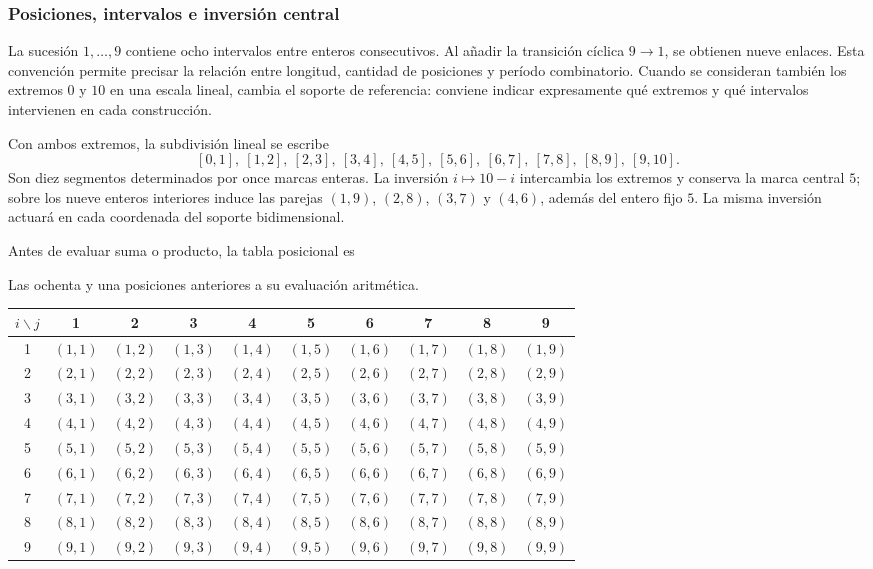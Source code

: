 \subsubsection{Posiciones, intervalos e inversión central}

La sucesión $1,\ldots,9$ contiene ocho intervalos entre enteros consecutivos. Al añadir la transición cíclica $9\to1$, se obtienen nueve enlaces. Esta convención permite precisar la relación entre longitud, cantidad de posiciones y período combinatorio. Cuando se consideran también los extremos $0$ y $10$ en una escala lineal, cambia el soporte de referencia: conviene indicar expresamente qué extremos y qué intervalos intervienen en cada construcción.

Con ambos extremos, la subdivisión lineal se escribe
\[
 [0,1],\ [1,2],\ [2,3],\ [3,4],\ [4,5],\
 [5,6],\ [6,7],\ [7,8],\ [8,9],\ [9,10].
\]
Son diez segmentos determinados por once marcas enteras. La inversión $i\mapsto10-i$ intercambia los extremos y conserva la marca central $5$; sobre los nueve enteros interiores induce las parejas $(1,9)$, $(2,8)$, $(3,7)$ y $(4,6)$, además del entero fijo $5$. La misma inversión actuará en cada coordenada del soporte bidimensional.

Antes de evaluar suma o producto, la tabla posicional es
\begin{tablacompleta}[htbp]
\caption{Las ochenta y una posiciones anteriores a su evaluación aritmética.}
\label{tab:app-posiciones}
{\small\setlength{\tabcolsep}{3pt}
\begin{tabular}{c*{9}{c}}
\toprule
$i\backslash j$ &1&2&3&4&5&6&7&8&9\\
\midrule
1 &$(1,1)$&$(1,2)$&$(1,3)$&$(1,4)$&$(1,5)$&$(1,6)$&$(1,7)$&$(1,8)$&$(1,9)$\\
2 &$(2,1)$&$(2,2)$&$(2,3)$&$(2,4)$&$(2,5)$&$(2,6)$&$(2,7)$&$(2,8)$&$(2,9)$\\
3 &$(3,1)$&$(3,2)$&$(3,3)$&$(3,4)$&$(3,5)$&$(3,6)$&$(3,7)$&$(3,8)$&$(3,9)$\\
4 &$(4,1)$&$(4,2)$&$(4,3)$&$(4,4)$&$(4,5)$&$(4,6)$&$(4,7)$&$(4,8)$&$(4,9)$\\
5 &$(5,1)$&$(5,2)$&$(5,3)$&$(5,4)$&$(5,5)$&$(5,6)$&$(5,7)$&$(5,8)$&$(5,9)$\\
6 &$(6,1)$&$(6,2)$&$(6,3)$&$(6,4)$&$(6,5)$&$(6,6)$&$(6,7)$&$(6,8)$&$(6,9)$\\
7 &$(7,1)$&$(7,2)$&$(7,3)$&$(7,4)$&$(7,5)$&$(7,6)$&$(7,7)$&$(7,8)$&$(7,9)$\\
8 &$(8,1)$&$(8,2)$&$(8,3)$&$(8,4)$&$(8,5)$&$(8,6)$&$(8,7)$&$(8,8)$&$(8,9)$\\
9 &$(9,1)$&$(9,2)$&$(9,3)$&$(9,4)$&$(9,5)$&$(9,6)$&$(9,7)$&$(9,8)$&$(9,9)$\\
\bottomrule
\end{tabular}}
\end{tablacompleta}

